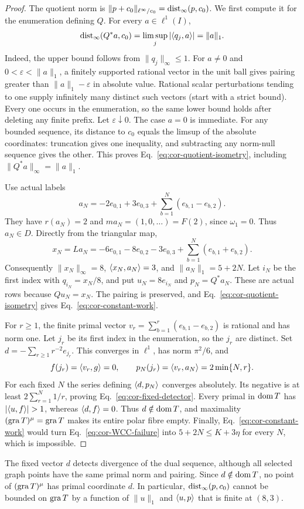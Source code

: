 \begin{proof}
The quotient norm is $\|p+c_0\|_{\ell^\infty/c_0}=\operatorname{dist}_\infty(p,c_0)$.
We first compute it for the enumeration defining $Q$.
For every $a\in\ell^1(I)$,
\begin{equation}
\operatorname{dist}_{\infty}(Q^*a,c_0)
=\limsup_j|\langle q_j,a\rangle|=\|a\|_1.
\label{eq:cor-quotient-isometry}
\end{equation}
Indeed, the upper bound follows from $\|q_j\|_\infty\le1$. For
$a\ne0$ and $0<\varepsilon<\|a\|_1$, a finitely supported rational
vector in the unit ball gives pairing greater than
$\|a\|_1-\varepsilon$ in absolute value. Rational scalar perturbations
tending to one supply infinitely many distinct such vectors (start
with a strict bound). Every one occurs in the enumeration, so the
same lower bound holds after deleting any finite prefix. Let
$\varepsilon\downarrow0$. The case $a=0$ is immediate. For any bounded
sequence, its distance to $c_0$ equals the limsup of the absolute
coordinates: truncation gives one inequality, and subtracting any
norm-null sequence gives the other. This proves
Eq.~\eqref{eq:cor-quotient-isometry}, including
$\|Q^*a\|_\infty=\|a\|_1$.

Use actual labels
\[
a_N=-2e_{0,1}+3e_{0,3}
       +\sum_{b=1}^N(e_{b,1}-e_{b,2}).
\]
They have $r(a_N)=2$ and $ma_N=(1,0,\ldots)=F(2)$, since
$\omega_1=0$. Thus $a_N\in D$. Directly from the triangular map,
\[
x_N=La_N=-6e_{0,1}-8e_{0,2}-3e_{0,3}
                  +\sum_{b=1}^N(e_{b,1}+e_{b,2}).
\]
Consequently $\|x_N\|_\infty=8$, $\langle x_N,a_N\rangle=3$, and
$\|a_N\|_1=5+2N$. Let $i_N$ be the first index with
$q_{i_N}=x_N/8$, and put $u_N=8e_{i_N}$ and $p_N=Q^*a_N$.
These are actual rows because $Qu_N=x_N$. The pairing is preserved,
and Eq.~\eqref{eq:cor-quotient-isometry} gives
Eq.~\eqref{eq:cor-constant-work}.

For $r\ge1$, the finite primal vector
$v_r=\sum_{b=1}^r(e_{b,1}-e_{b,2})$ is rational and has norm one.
Let $j_r$ be its first index in the enumeration, so the $j_r$ are
distinct. Set $d=-\sum_{r\ge1}r^{-2}e_{j_r}$. This converges in
$\ell^1$, has norm $\pi^2/6$, and
\[
f(j_r)=\langle v_r,g\rangle=0,\qquad
p_N(j_r)=\langle v_r,a_N\rangle=2\min\{N,r\}.
\]
For each fixed $N$ the series defining $\langle d,p_N\rangle$ converges
absolutely. Its negative is at least
$2\sum_{r=1}^N1/r$, proving Eq.~\eqref{eq:cor-fixed-detector}.
Every primal in $\operatorname{dom} T$ has $|\pair{u}{f}|>1$, whereas
$\langle d,f\rangle=0$. Thus $d\notin\operatorname{dom} T$, and maximality
$(\operatorname{gra} T)^\mu=\operatorname{gra} T$ makes its entire polar fibre empty.
Finally, Eq.~\eqref{eq:cor-constant-work} would turn
Eq.~\eqref{eq:cor-WCC-failure} into $5+2N\le K+3\eta$ for every
$N$, which is impossible.
\end{proof}
The fixed vector $d$ detects divergence of the dual sequence, although
all selected graph points have the same primal norm and pairing.
Since $d\notin\operatorname{dom} T$, no point of $(\operatorname{gra} T)^\mu$ has primal coordinate
$d$. In particular, $\operatorname{dist}_\infty(p,c_0)$ cannot be bounded on $\operatorname{gra} T$
by a function of $\|u\|_1$ and $\langle u,p\rangle$ that is finite at $(8,3)$.


